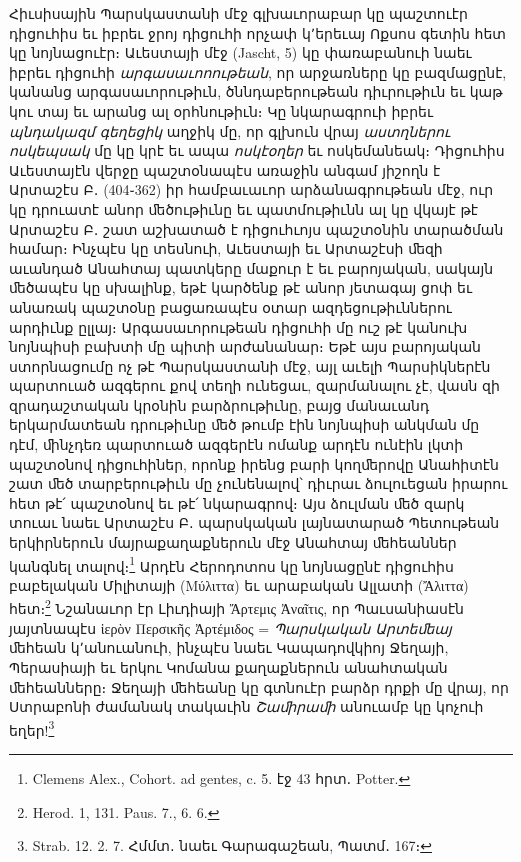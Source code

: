 \documentclass{article}
\begin{document}
{Հիւսիսային Պարսկաստանի մէջ գլխաւորաբար կը պաշտուէր դիցուհիս եւ իբրեւ ջրոյ դիցուհի որչափ կ՚երեւայ Ոքսոս գետին հետ կը նոյնացուէր։ Աւեստայի մէջ (Jascht, 5) կը փառաբանուի նաեւ իբրեւ դիցուհի \emph{արգասաւոոութեան}, որ արջառները կը բազմացընէ, կանանց արգասաւորութիւն, ծննդաբերութեան դիւրութիւն եւ կաթ կու տայ եւ արանց ալ օրհնութիւն։ Կը նկարագրուի իբրեւ \emph{պնդակազմ գեղեցիկ} աղջիկ մը, որ գլխուն վրայ \emph{աստղներու ոսկեպսակ} մը կը կրէ եւ ապա \emph{ոսկէօղեր} եւ ոսկեմանեակ։ Դիցուհիս Աւեստայէն վերջը պաշտօնապէս առաջին անգամ յիշողն է Արտաշէս Բ․ (404֊362) իր համբաւաւոր արձանագրութեան մէջ, ուր կը դրուատէ անոր ﬔծութիւնը եւ պատմութիւնն ալ կը վկայէ թէ Արտաշէս Բ․ շատ աշխատած է դիցուհւոյս պաշտօնին տարածման համար։ Ինչպէս կը տեսնուի, Աւեստայի եւ Արտաշէսի ﬔզի աւանդած Անահտայ պատկերը մաքուր է եւ բարոյական, սակայն ﬔծապէս կը սխալինք, եթէ կարծենք թէ անոր յետագայ ցոփ եւ անառակ պաշտօնը բացառապէս օտար ազդեցութիւններու արդիւնք ըլլայ։ Արգասաւորութեան դիցուհի մը ուշ թէ կանուխ նոյնպիսի բախտի մը պիտի արժանանար։ Եթէ այս բարոյական ստորնացումը ոչ թէ Պարսկաստանի մէջ, այլ աւելի Պարսիկներէն պարտուած ազգերու քով տեղի ունեցաւ, զարմանալու չէ, վասն զի զրադաշտական կրօնին բարձրութիւնը, բայց մանաւանդ երկարմատեան դրութիւնը ﬔծ թումբ էին նոյնպիսի անկման մը դէմ, ﬕնչդեռ պարտուած ազգերէն ոմանք արդէն ունէին լկտի պաշտօնով դիցուհիներ, որոնք իրենց բարի կողﬔրովը Անահիտէն շատ ﬔծ տարբերութիւն մը չունենալով՝ դիւրաւ ձուլուեցան իրարու հետ թէ՛ պաշտօնով եւ թէ՛ նկարագրով։ Այս ձուլման ﬔծ զարկ տուաւ նաեւ Արտաշէս Բ․ պարսկական լայնատարած Պետութեան երկիրներուն մայրաքաղաքներուն մէջ Անահտայ ﬔհեաններ կանգնել տալով։\footnote{Clemens Alex., Cohort. ad gentes, c. 5. էջ 43 հրտ․ Potter.} Արդէն Հերոդոտոս կը նոյնացընէ դիցուհիս բաբելական Միլիտայի (Μύλιττα) եւ արաբական Ալլատի (Ἄλιττα) հետ։\footnote{Herod. 1, 131. Paus. 7., 6. 6.} Նշանաւոր էր Լիւդիայի Ἄρτεμις Ἀναῖτις, որ Պաւսանիասէն յայտնապէս ἱερὸν Περσικῆς Ἀρτέμιδος = \emph{Պարսկական Արտեﬔայ} ﬔհեան կ՚անուանուի, ինչպէս նաեւ Կապադովկիոյ Ջեղայի, Պերասիայի եւ երկու Կոմանա քաղաքներուն անահտական ﬔհեանները։ Ջեղայի ﬔհեանը կը գտնուէր բարձր դրքի մը վրայ, որ Ստրաբոնի ժամանակ տակաւին \emph{Շաﬕրաﬕ} անուամբ կը կոչուի եղեր!\footnote{Strab. 12. 2. 7. Հմմտ․ նաեւ Գարագաշեան, Պատմ․ 167։}

}
\end{document}
